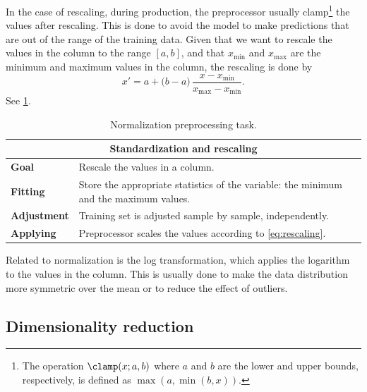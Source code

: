 In the case of rescaling, during production, the preprocessor usually clamp\footnote{The
operation $\clamp(x; a, b)$ where $a$ and $b$ are the lower and upper bounds,
respectively, is defined as $\max(a, \min(b, x))$.} the values after rescaling.  This is
done to avoid the model to make predictions that are out of the range of the training
data.  Given that we want to rescale the values in the column to the range $[a, b]$, and
that $x_\text{min}$ and $x_\text{max}$ are the minimum and maximum values in the column,
the rescaling is done by
\begin{equation}
  \label{eq:rescaling}
  x' = a + \big(b - a\big) \, \frac{x - x_\text{min}}{x_\text{max} - x_\text{min}}\text{.}
\end{equation}
See \cref{tab:rescaling}.

\begin{table}\caption{Normalization preprocessing task.}
  \centering
  \begin{tabular}{lp{6cm}}
    \toprule
    \multicolumn{2}{c}{\textbf{Standardization and rescaling}} \\
    \midrule
    \textbf{Goal} &
      Rescale the values in a column. \\
    \textbf{Fitting} &
      Store the appropriate statistics of the variable: the minimum and the maximum
      values. \\
    \textbf{Adjustment} &
      Training set is adjusted sample by sample, independently. \\
    \textbf{Applying} &
      Preprocessor scales the values according to \cref{eq:rescaling}. \\
    \bottomrule
  \end{tabular}
  \label{tab:rescaling}
\end{table}

Related to normalization is the log transformation, which applies the logarithm to the
values in the column.  This is usually done to make the data distribution more symmetric
over the mean or to reduce the effect of outliers.


\subsection{Dimensionality reduction}

